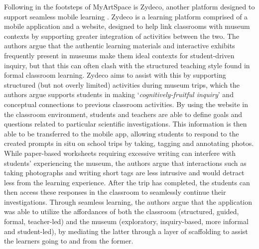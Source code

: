 Following in the footsteps of MyArtSpace is Zydeco, another platform designed to support seamless mobile learning \citep{cahill2010, kuhn2011}. Zydeco is a learning platform comprised of a mobile application and a website, designed to help link classrooms with museum contexts by supporting greater integration of activities between the two. The authors argue that the authentic learning materials and interactive exhibits frequently present in museums make them ideal contexts for student-driven inquiry, but that this can often clash with the structured teaching style found in formal classroom learning. Zydeco aims to assist with this by supporting structured (but not overly limited) activities during museum trips, which the authors argue supports students in making `\textit{cognitively-fruitful inquiry}' and conceptual connections to previous classroom activities. By using the website in the classroom environment, students and teachers are able to define goals and questions related to particular scientific investigations. This information is then able to be transferred to the mobile app, allowing students to respond to the created prompts in situ on school trips by taking, tagging and annotating photos. While paper-based worksheets requiring excessive writing can interfere with students' experiencing the museum, the authors argue that interactions such as taking photographs and writing short tags are less intrusive and would detract less from the learning experience.  After the trip has completed, the students can then access these responses in the classroom to seamlessly continue their investigations. Through seamless learning, the authors argue that the application was able to utilize the affordances of both the classroom (structured, guided, formal, teacher-led) and the museum (exploratory, inquiry-based, more informal and student-led), by mediating the latter through a layer of scaffolding to assist the learners going to and from the former.

